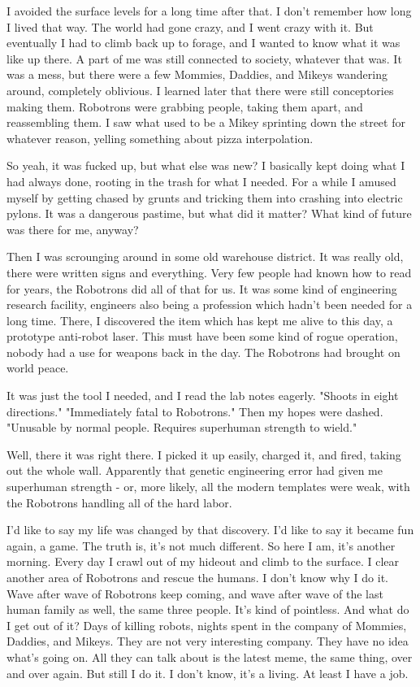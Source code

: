 \documentclass{amsbook}
\begin{document}
I avoided the surface levels for a long time after that.  I don't remember how long I lived that way.  The world had gone crazy, and I went crazy with it.  But eventually I had to climb back up to forage, and I wanted to know what it was like up there.  A part of me was still connected to society, whatever that was.  It was a mess, but there were a few Mommies, Daddies, and Mikeys wandering around, completely oblivious.  I learned later that there were still conceptories making them.  Robotrons were grabbing people, taking them apart, and reassembling them.  I saw what used to be a Mikey sprinting down the street for whatever reason, yelling something about pizza interpolation.

So yeah, it was fucked up, but what else was new?  I basically kept doing what I had always done, rooting in the trash for what I needed.  For a while I amused myself by getting chased by grunts and tricking them into crashing into electric pylons.  It was a dangerous pastime, but what did it matter?  What kind of future was there for me, anyway?

Then I was scrounging around in some old warehouse district.  It was really old, there were written signs and everything.  Very few people had known how to read for years, the Robotrons did all of that for us.  It was some kind of engineering research facility, engineers also being a profession which hadn't been needed for a long time.  There, I discovered the item which has kept me alive to this day, a prototype anti-robot laser.  This must have been some kind of rogue operation, nobody had a use for weapons back in the day.  The Robotrons had brought on world peace.

It was just the tool I needed, and I read the lab notes eagerly. "Shoots in eight directions." "Immediately fatal to Robotrons."  Then my hopes were dashed.  "Unusable by normal people.  Requires superhuman strength to wield."

Well, there it was right there.  I picked it up easily, charged it, and fired, taking out the whole wall.  Apparently that genetic engineering error had given me superhuman strength - or, more likely, all the modern templates were weak, with the Robotrons handling all of the hard labor.

I'd like to say my life was changed by that discovery.  I'd like to say it became fun again, a game.  The truth is, it's not much different.  So here I am, it's another morning.  Every day I crawl out of my hideout and climb to the surface.  I clear another area of Robotrons and rescue the humans.  I don't know why I do it.  Wave after wave of Robotrons keep coming, and wave after wave of the last human family as well, the same three people.  It's kind of pointless.  And what do I get out of it?  Days of killing robots, nights spent in the company of Mommies, Daddies, and Mikeys.  They are not very interesting company.  They have no idea what's going on.  All they can talk about is the latest meme, the same thing, over and over again.  But still I do it.  I don't know, it's a living.  At least I have a job.
\clearpage
\end{document}
